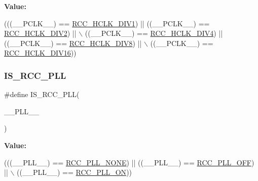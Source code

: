 {\bfseries Value\+:}
\begin{DoxyCode}
(((\_\_PCLK\_\_) == \hyperlink{group___r_c_c___a_p_b1___clock___source_ga8e3fcdef0e5d77bb61a52420fe1e9fbc}{RCC\_HCLK\_DIV1}) || ((\_\_PCLK\_\_) == \hyperlink{group___r_c_c___a_p_b1___clock___source_ga4d2ebcf280d85e8449a5fb7b994b5169}{RCC\_HCLK\_DIV2}) || \(\backslash\)
                               ((\_\_PCLK\_\_) == \hyperlink{group___r_c_c___a_p_b1___clock___source_ga85b5f4fd936e22a3f4df5ed756f6e083}{RCC\_HCLK\_DIV4}) || ((\_\_PCLK\_\_) == 
      \hyperlink{group___r_c_c___a_p_b1___clock___source_gadb18bc60e2c639cb59244bedb54f7bb3}{RCC\_HCLK\_DIV8}) || \(\backslash\)
                               ((\_\_PCLK\_\_) == \hyperlink{group___r_c_c___a_p_b1___clock___source_ga27ac27d48360121bc2dc68b99dc8845d}{RCC\_HCLK\_DIV16}))
\end{DoxyCode}
\mbox{\label{group___r_c_c___private___macros_ga4e8a1f3a151c3011e915df4da312dd73}} 
\subsubsection{\texorpdfstring{I\+S\+\_\+\+R\+C\+C\+\_\+\+P\+LL}{IS\_RCC\_PLL}}
{\footnotesize\ttfamily \#define I\+S\+\_\+\+R\+C\+C\+\_\+\+P\+LL(\begin{DoxyParamCaption}\item[{}]{\+\_\+\+\_\+\+P\+L\+L\+\_\+\+\_\+ }\end{DoxyParamCaption})}

{\bfseries Value\+:}
\begin{DoxyCode}
(((\_\_PLL\_\_) == \hyperlink{group___r_c_c___p_l_l___config_gae47a612f8e15c32917ee2181362d88f3}{RCC\_PLL\_NONE}) || ((\_\_PLL\_\_) == \hyperlink{group___r_c_c___p_l_l___config_ga3a8d5c8bcb101c6ca1a574729acfa903}{RCC\_PLL\_OFF}) || \(\backslash\)
                             ((\_\_PLL\_\_) == \hyperlink{group___r_c_c___p_l_l___config_gaf86dbee130304ba5760818f56d34ec91}{RCC\_PLL\_ON}))
\end{DoxyCode}
\mbox{\label{group___r_c_c___private___macros_gaaa87e62aba8556651b5d09e2f7ec4db5}} 
